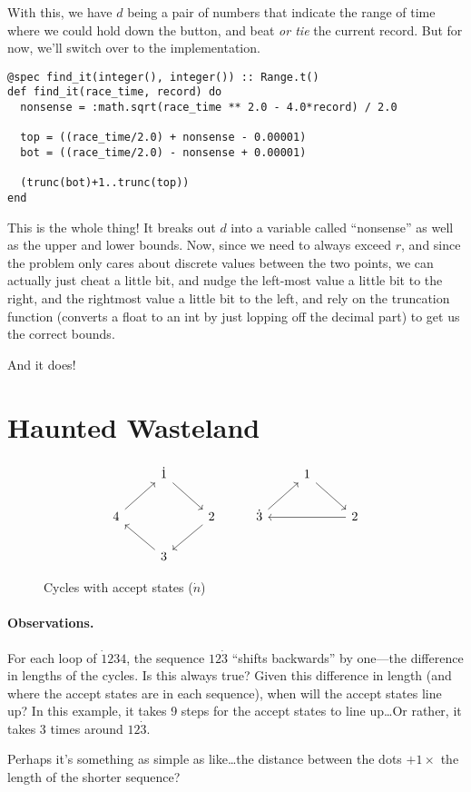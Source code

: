 \documentclass{article}
\begin{document}
With this, we have $d$ being a pair of numbers that indicate the range of time where we could hold down the button, and beat \emph{or tie} the current record. But for now, we'll switch over to the implementation.

\begin{verbatim}
@spec find_it(integer(), integer()) :: Range.t()
def find_it(race_time, record) do
  nonsense = :math.sqrt(race_time ** 2.0 - 4.0*record) / 2.0

  top = ((race_time/2.0) + nonsense - 0.00001)
  bot = ((race_time/2.0) - nonsense + 0.00001)

  (trunc(bot)+1..trunc(top))
end
\end{verbatim}

This is the whole thing! It breaks out $d$ into a variable called ``nonsense'' as well as the upper and lower bounds. Now, since we need to always exceed $r$, and since the problem only cares about discrete values between the two points, we can actually just cheat a little bit, and nudge the left-most value a little bit to the right, and the rightmost value a little bit to the left, and rely on the truncation function (converts a float to an int by just lopping off the decimal part) to get us the correct bounds.

And it does!


\setcounter{section}{7}
\section{Haunted Wasteland}
\begin{figure*}[h]
  \centering
\[\begin{tikzcd}
	& {\dot{1}} &&& 1 \\
	4 && 2 & {\dot{3}} && 2 \\
	& 3
	\arrow[from=1-2, to=2-3]
	\arrow[from=2-3, to=3-2]
	\arrow[from=3-2, to=2-1]
	\arrow[from=2-1, to=1-2]
	\arrow[from=1-5, to=2-6]
	\arrow[from=2-6, to=2-4]
	\arrow[from=2-4, to=1-5]
\end{tikzcd}\]

\caption{Cycles with accept states ($\dot{n}$)}
\end{figure*}

\paragraph{Observations.} For each loop of $\dot{1}234$, the sequence $12\dot{3}$ ``shifts backwards'' by one---the difference in lengths of the cycles. Is this always true? \bullet{} Given this difference in length (and where the accept states are in each sequence), when will the accept states line up? \bullet{} In this example, it takes 9 steps for the accept states to line up\dots Or rather, it takes 3 times around $12\dot{3}$.


Perhaps it's something as simple as like\dots the distance between the dots $+ 1 \times$ the length of the shorter sequence?
\end{document}
